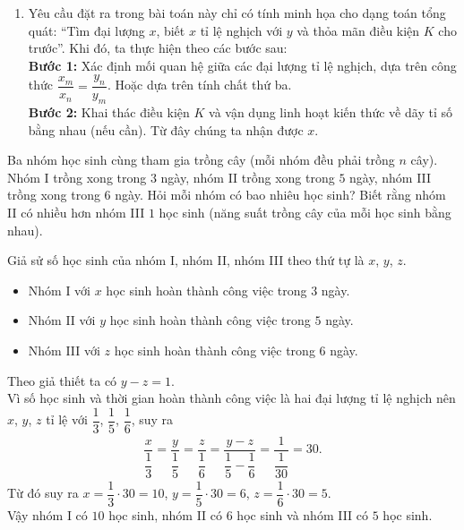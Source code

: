 \begin{vd}
{\begin{note}
\begin{enumerate}
   	Theo giả thiết ta có
   	\begin{eqnarray*}
   	 t_1+t_2=13{,}5 \Leftrightarrow 4(t_1+t_2) = 4 \cdot 13{,}5 \Leftrightarrow 4t_1+4t_2=54 \Leftrightarrow 4t_1+5t_1=54 \Leftrightarrow t_1=6.
   	\end{eqnarray*}
   	Vậy độ dài quãng đường $AB$ là $60 \cdot 6 = 360 \mathrm{\,km}$.
   	\item Yêu cầu đặt ra trong bài toán này chỉ có tính minh họa cho dạng toán tổng quát: ``Tìm đại lượng $x$, biết $x$ tỉ lệ nghịch với $y$ và thỏa mãn điều kiện $K$ cho trước''. Khi đó, ta thực hiện theo các bước sau:	\\
   	{\bf Bước 1:} Xác định mối quan hệ giữa các đại lượng tỉ lệ nghịch, dựa trên công thức $\dfrac{x_m}{x_n} = \dfrac{y_n}{y_m}$. Hoặc dựa trên tính chất thứ ba.\\
   	{\bf Bước 2:} Khai thác điều kiện $K$ và vận dụng linh hoạt kiến thức về dãy tỉ số bằng nhau (nếu cần). Từ đây chúng ta nhận được $x$.
   \end{enumerate}
  \end{note}
  }
\end{vd}

\begin{vd}%
 Ba nhóm học sinh cùng tham gia trồng cây (mỗi nhóm đều phải trồng $n$ cây). Nhóm I trồng xong trong $3$ ngày, nhóm II trồng xong trong $5$ ngày, nhóm III trồng xong trong $6$ ngày. Hỏi mỗi nhóm có bao nhiêu học sinh? Biết rằng nhóm II có nhiều hơn nhóm III $1$ học sinh (năng suất trồng cây của mỗi học sinh bằng nhau).
 \loigiai
  {
  Giả sử số học sinh của nhóm I, nhóm II, nhóm III theo thứ tự là $x$, $y$, $z$.
  \begin{itemize}
   \item Nhóm I với $x$ học sinh hoàn thành công việc trong $3$ ngày.
   \item Nhóm II với $y$ học sinh hoàn thành công việc trong $5$ ngày.
   \item Nhóm III với $z$ học sinh hoàn thành công việc trong $6$ ngày.
  \end{itemize}
  Theo giả thiết ta có $y-z=1$.\\
  Vì số học sinh và thời gian hoàn thành công việc là hai đại lượng tỉ lệ nghịch nên $x$, $y$, $z$ tỉ lệ với $\dfrac{1}{3}$, $\dfrac{1}{5}$, $\dfrac{1}{6}$, suy ra
  \begin{eqnarray*}
   \dfrac{x}{\dfrac{1}{3}} = \dfrac{y}{\dfrac{1}{5}} = \dfrac{z}{\dfrac{1}{6}} = \dfrac{y-z}{\dfrac{1}{5} - \dfrac{1}{6}} = \dfrac{1}{\dfrac{1}{30}} = 30.
  \end{eqnarray*}
  Từ đó suy ra $x=\dfrac{1}{3} \cdot 30 = 10$, $y=\dfrac{1}{5} \cdot 30 = 6$, $z=\dfrac{1}{6} \cdot 30 = 5$.\\
  Vậy nhóm I có $10$ học sinh, nhóm II có $6$ học sinh và nhóm III có $5$ học sinh.
  }
\end{vd}


